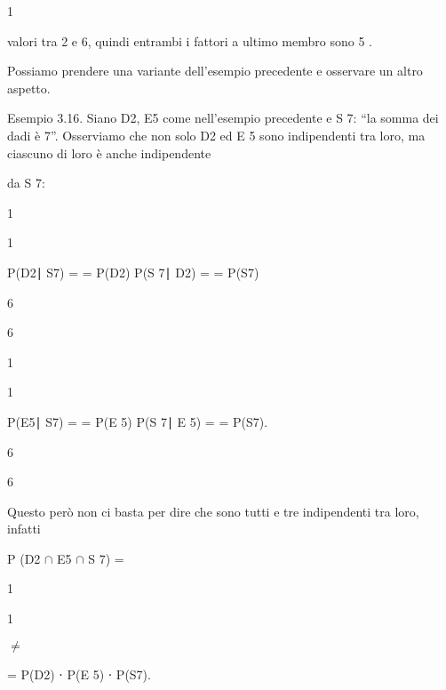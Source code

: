 \documentclass[a4paper,portrait,12pt]{article}
\begin{document}
1


\begin{flushleft}
valori tra 2 e 6, quindi entrambi i fattori a ultimo membro sono 5 .
\end{flushleft}


\begin{flushleft}
Possiamo prendere una variante dell'esempio precedente e osservare un altro aspetto.
\end{flushleft}


\begin{flushleft}
Esempio 3.16. Siano D2, E5 come nell'esempio precedente e S 7: ``la somma dei dadi \`{e} 7''. Osserviamo che non solo D2 ed E 5 sono indipendenti tra loro, ma ciascuno di loro \`{e} anche indipendente
\end{flushleft}


\begin{flushleft}
da S 7:
\end{flushleft}


1


1


\begin{flushleft}
P(D2∣ S7) = = P(D2) P(S 7∣ D2) = = P(S7)
\end{flushleft}


6


6


1


1


\begin{flushleft}
P(E5∣ S7) = = P(E 5) P(S 7∣ E 5) = = P(S7).
\end{flushleft}


6


6


\begin{flushleft}
Questo per\`{o} non ci basta per dire che sono tutti e tre indipendenti tra loro, infatti
\end{flushleft}


\begin{flushleft}
P (D2 $\cap$ E5 $\cap$ S 7) =
\end{flushleft}





1


1


$\neq$


\begin{flushleft}
= P(D2) ⋅ P(E 5) ⋅ P(S7).
\end{flushleft}
\end{document}
